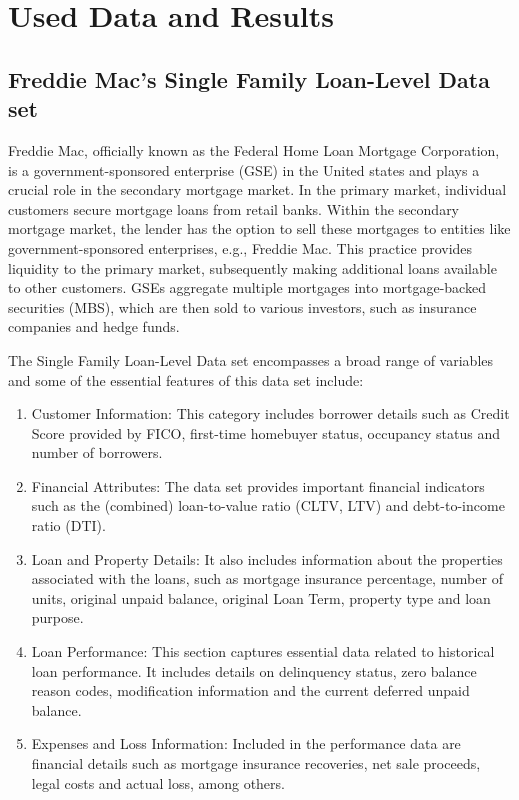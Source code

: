 \chapter{Used Data and Results}
\label{ch:RE}
\section{Freddie Mac's Single Family Loan-Level Data set}

Freddie Mac, officially known as the Federal Home Loan Mortgage Corporation, is a government-sponsored enterprise (GSE) in the United states and plays a crucial role in the secondary mortgage market. In the primary market, individual customers secure mortgage loans from retail banks. Within the secondary mortgage market, the lender has the option to sell these mortgages to entities like government-sponsored enterprises, e.g., Freddie Mac. This practice provides liquidity to the primary market, subsequently making additional loans available to other customers. GSEs aggregate multiple mortgages into mortgage-backed securities (MBS), which are then sold to various investors, such as insurance companies and hedge funds. \cite{FreddieMac:2023} \cite{SecMortMark:2023}

The Single Family Loan-Level Data set encompasses a broad range of variables and some of the essential features of this data set include:

\begin{enumerate}
\item Customer Information: This category includes borrower details such as Credit Score provided by FICO, first-time homebuyer status, occupancy status and number of borrowers.
\item Financial Attributes: The data set provides important financial indicators such as the (combined) loan-to-value ratio (CLTV, LTV) and debt-to-income ratio (DTI).
\item Loan and Property Details: It also includes information about the properties associated with the loans, such as mortgage insurance percentage, number of units, original unpaid balance, original Loan Term, property type and loan purpose.
\item Loan Performance: This section captures essential data related to historical loan performance. It includes details on delinquency status, zero balance reason codes, modification information and the current deferred unpaid balance.
\item Expenses and Loss Information: Included in the performance data are financial details such as mortgage insurance recoveries, net sale proceeds, legal costs and actual loss, among others.
\end{enumerate}

